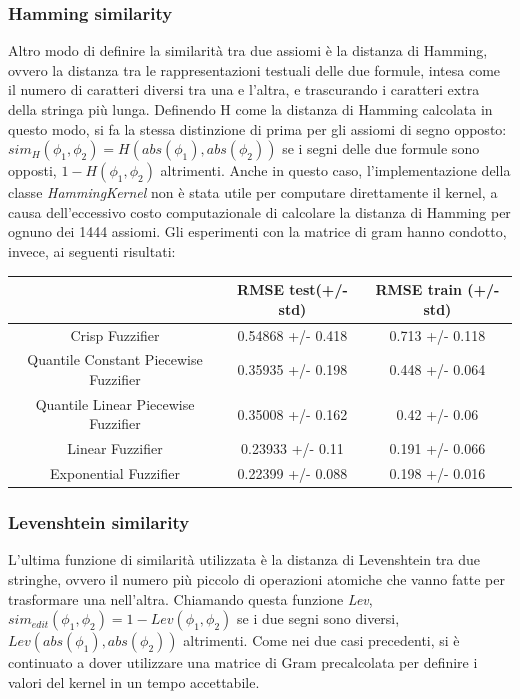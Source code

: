 \documentclass[12pt,a4paper]{report}
\begin{document}
\subsubsection{Hamming similarity}
Altro modo di definire la similarità tra due assiomi è la distanza di Hamming, ovvero la distanza tra le rappresentazioni testuali delle due formule, intesa come il numero di caratteri diversi tra una e l'altra, e trascurando i caratteri extra della stringa più lunga.
Definendo H come la distanza di Hamming calcolata in questo modo, si fa la stessa distinzione di prima per gli assiomi di segno opposto:  $sim_{H}(\phi_1, \phi_2) = H(abs(\phi_1),abs(\phi_2))$ se i segni delle due formule sono opposti, $1 - H(\phi_1, \phi_2)$ altrimenti.
Anche in questo caso, l'implementazione della classe \emph{HammingKernel} non è stata utile per computare direttamente il kernel, a causa dell'eccessivo costo computazionale di calcolare la distanza di Hamming per ognuno dei 1444 assiomi. Gli esperimenti con la matrice di gram hanno condotto, invece, ai seguenti risultati:

\begin{table}[h!]
\centering 	
	\begin{tabular}{|c|c|c|} 
	 \hline
	  & RMSE test(+/- std) & RMSE train (+/- std)\\ [0.5ex] 
	 \hline
	 Crisp Fuzzifier & 0.54868 +/- 0.418 & 0.713 +/- 0.118 \\ 
	 \hline
	 Quantile Constant Piecewise Fuzzifier & 0.35935 +/- 0.198 & 0.448 +/- 0.064\\
	 \hline
	 Quantile Linear Piecewise Fuzzifier & 0.35008 +/- 0.162 & 0.42 +/- 0.06\\
	 \hline
	 Linear Fuzzifier &0.23933 +/- 0.11 & 0.191 +/- 0.066\\
	 \hline
	 Exponential Fuzzifier & 0.22399 +/- 0.088 & 0.198 +/- 0.016\\ [1ex] 
	 \hline
	\end{tabular}
\end{table}

\subsubsection{Levenshtein similarity}
L'ultima funzione di similarità utilizzata è la distanza di Levenshtein tra due stringhe, ovvero il numero più piccolo di operazioni atomiche che vanno fatte per trasformare una nell'altra. Chiamando questa funzione \emph{Lev}, $sim_{edit}(\phi_1, \phi_2) = 1 - Lev(\phi_1,\phi_2)$ se i due segni sono diversi, $Lev(abs(\phi_1),abs(\phi_2))$ altrimenti.
Come nei due casi precedenti, si è continuato a dover utilizzare una matrice di Gram precalcolata per definire i valori del kernel in un tempo accettabile.
\end{document}
